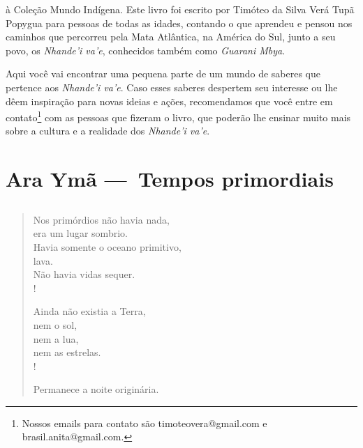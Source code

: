  

 à Coleção Mundo
Indígena. Este livro foi escrito por Timóteo da Silva
Verá Tupã Popygua para pessoas de todas as
idades, contando o que aprendeu e pensou nos caminhos que
percorreu pela Mata Atlântica, na América do Sul, junto a seu
povo, os \textit{Nhande'i va'e}, conhecidos também
como \textit{Guarani Mbya}.

 

Aqui você vai encontrar uma pequena parte de um mundo de saberes
que pertence aos \textit{Nhande'i va'e}. Caso esses saberes
despertem seu interesse ou lhe dêem inspiração para novas ideias e
ações, recomendamos que você entre em
contato\footnote{ Nossos emails para contato são timoteovera@gmail.com
e brasil.anita@gmail.com.} com as pessoas que fizeram o livro, que
poderão lhe ensinar muito mais sobre a cultura e a realidade
dos \textit{Nhande'i va'e}.

 

\part[Tempos primordiais]{Ara Ymã — Tempos primordiais}

\chapter*{}

 

\begin{verse}
Nos primórdios não havia nada,\\
era um lugar sombrio.\\
Havia somente o oceano primitivo,\\
lava.\\
Não havia vidas sequer.\\!
 

Ainda não existia a Terra,\\
nem o sol,\\
nem a lua,\\
nem as estrelas.\\!
 
Permanece a noite originária.
\end{verse}
